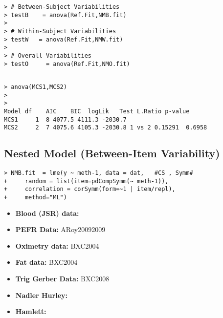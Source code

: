 \begin{framed}
\begin{verbatim}
> # Between-Subject Variabilities
> testB    = anova(Ref.Fit,NMB.fit) 
>         
> # Within-Subject Variabilities                
> testW   = anova(Ref.Fit,NMW.fit) 
>                       
> # Overall Variabilities
> testO     = anova(Ref.Fit,NMO.fit)                        


\end{verbatim}
\end{framed}
\begin{framed}   
\begin{verbatim}
> anova(MCS1,MCS2)
>
>
Model df    AIC    BIC  logLik   Test L.Ratio p-value
MCS1     1  8 4077.5 4111.3 -2030.7
MCS2     2  7 4075.6 4105.3 -2030.8 1 vs 2 0.15291  0.6958
\end{verbatim}
\end{framed}

\subsection{Nested Model (Between-Item Variability)}
\begin{framed}
\begin{verbatim}
> NMB.fit  = lme(y ~ meth-1, data = dat,   #CS , Symm#
+     random = list(item=pdCompSymm(~ meth-1)),
+     correlation = corSymm(form=~1 | item/repl), 
+     method="ML")
\end{verbatim}
\end{framed}




\begin{itemize}
\item \textbf{Blood (JSR) data:} 
\item \textbf{PEFR Data:} ARoy20092009
\item \textbf{Oximetry data:} BXC2004
\item \textbf{Fat data:} BXC2004
\item \textbf{Trig Gerber Data:} BXC2008
\item \textbf{Nadler Hurley:}
\item \textbf{Hamlett:}
\end{itemize}



